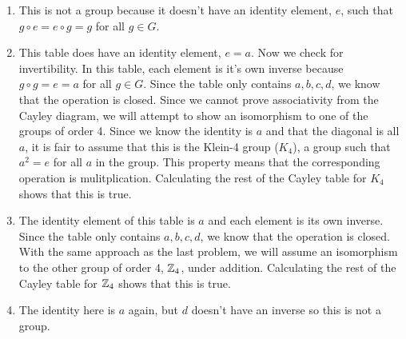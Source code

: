 \documentclass{report}
\begin{document}

\sol

\begin{enumerate}[label=\alph*.]
    \item This is not a group because it doesn't have an identity element, $e$, such that $g \circ e = e \circ g = g$ for all $g \in G$.
    \item This table does have an identity element, $e = a$. Now we check for invertibility. In this table, each element is it's own inverse because $g \circ g = e = a$ for all $g \in G$. Since the table only contains $a,b,c,d$, we know that the operation is closed. Since we cannot prove associativity from the Cayley diagram, we will attempt to show an isomorphism to one of the groups of order 4. Since we know the identity is $a$ and that the diagonal is all $a$, it is fair to assume that this is the Klein-4 group ($K_4$), a group such that $a^2 = e$ for all $a$ in the group. This property means that the corresponding operation is mulitplication. Calculating the rest of the Cayley table for $K_4$ shows that this is true.
    \item The identity element of this table is $a$ and each element is its own inverse. Since the table only contains $a,b,c,d$, we know that the operation is closed. With the same approach as the last problem, we will assume an isomorphism to the other group of order 4, $\ZZ_4$, under addition. Calculating the rest of the Cayley table for $\ZZ_4$ shows that this is true.
    \item The identity here is $a$ again, but $d$ doesn't have an inverse so this is not a group. 
\end{enumerate}
\end{document}
